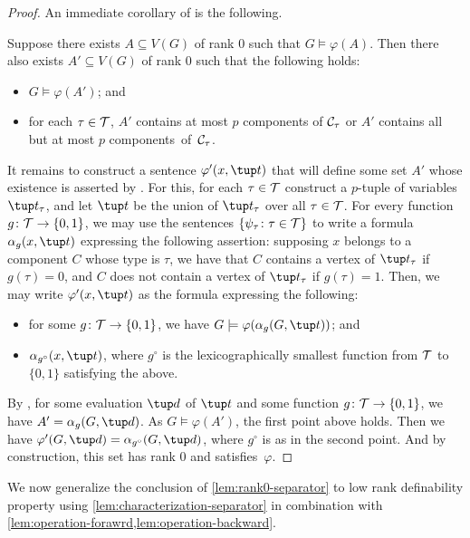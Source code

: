 \begin{proof}
 An immediate corollary of  is the following.

 \begin{claim}\label{cl:idemp}
  Suppose there exists $A\subseteq V(G)$ of rank $0$ such that $G\models \varphi(A)$.
  Then there also exists $A'\subseteq V(G)$ of rank $0$ such that the following holds:
  \begin{itemize}[nosep]
   \item $G\models \varphi(A')$; and
   \item for each $\tau \in \cal T$, $A'$ contains at most $p$ components of $\cal C_\tau$ or $A'$ contains all but at most $p$ components~of~$\cal C_\tau$.
  \end{itemize}
 \end{claim}

 It remains to construct a sentence $\varphi'(x,\tup t)$ that will define some set $A'$ whose existence is asserted by . For this, for each $\tau \in \cal T$ construct a $p$-tuple of variables $\tup t_\tau$, and let $\tup t$ be the union of $\tup t_\tau$ over all $\tau\in \cal T$. For every function $g\colon {\cal T}\to \{0,1\}$, we may use the sentences $\{\psi_\tau\colon \tau\in \cal T\}$ to write a formula $\alpha_g(x,\tup t)$ expressing the following assertion:
 supposing $x$ belongs to a component $C$ whose type is $\tau$, we have that $C$ contains a vertex of $\tup t_\tau$ if $g(\tau)=0$, and $C$ does not contain a vertex of $\tup t_\tau$ if $g(\tau)=1$. Then, we may write $\varphi'(x,\tup t)$ as the formula expressing the following:
 \begin{itemize}[nosep]
  \item for some $g\colon {\cal T}\to \{0,1\}$, we have $G\models \varphi(\alpha_g(G,\tup t))$; and
  \item $\alpha_{g^\circ}(x,\tup t)$, where $g^\circ$ is the lexicographically smallest function from $\cal T$ to $\{0,1\}$ satisfying the above.
 \end{itemize}
 By , for some evaluation $\tup d$ of $\tup t$ and some function $g\colon {\cal T}\to \{0,1\}$, we have $A'=\alpha_g(G,\tup d)$. As $G\models \varphi(A')$, the first point above holds. Then we have $\varphi'(G,\tup d)=\alpha_{g^\circ}(G,\tup d)$, where $g^{\circ}$ is as in the second point. And by construction, this set has rank $0$ and satisfies~$\varphi$.
\end{proof}

We now generalize the conclusion of \cref{lem:rank0-separator} to low rank definability property using \cref{lem:characterization-separator} in combination with \cref{lem:operation-forawrd,lem:operation-backward}.

